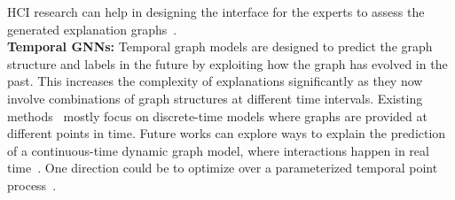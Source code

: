  HCI research can help in designing the interface for the experts to assess the generated explanation graphs~\cite{cfgnnex}. \\
\textbf{Temporal GNNs: } Temporal graph models are designed to predict the graph structure and labels in the future by exploiting how the graph has evolved in the past. This increases the complexity of explanations significantly as they now involve combinations of graph structures at different time intervals. Existing methods~\cite{fan2021gcn,xie2022explaining,he2022explainer,kosan2021event} mostly focus on discrete-time models where graphs are provided at different points in time. Future works can explore ways to explain the prediction of a continuous-time dynamic graph model, where interactions happen in real time~\cite{xiaexplaining}. One direction could be to optimize over a parameterized temporal point process~\cite{trivedi2019dyrep}. 